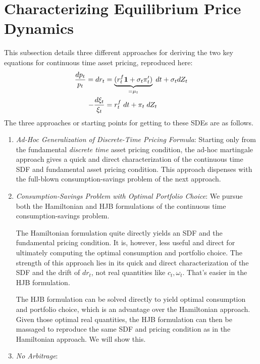 \documentclass[12pt]{article}
\theoremstyle{plain}
\theoremstyle{definition}
\theoremstyle{remark}
\begin{document}
\clearpage
\section{Characterizing Equilibrium Price Dynamics}

This subsection details three different approaches for deriving the two
key equations for continuous time asset pricing, reproduced here:
\begin{align*}
  \frac{dp_t}{p_t}
  =
  dr_t
  &=
  \underbrace{%
    (r_t^f\mathbf{1}+\sigma_t\pi_t')
  }_{=\mu_t}
  \;dt
  +
  \sigma_t
  dZ_t
  \\
  -
  \frac{d\xi_t}{\xi_t}
  &=
  r_t^f\;dt + \pi_t \;dZ_t
\end{align*}
The three approaches or starting points for getting to these SDEs are as
follows.
\begin{enumerate}
  \item
    \emph{Ad-Hoc Generalization of Discrete-Time Pricing Formula}:
    Starting only from the fundamental \emph{discrete time} asset
    pricing condition, the ad-hoc martingale approach gives a quick and
    direct characterization of the continuous time SDF and fundamental
    asset pricing condition.
    This approach dispenses with the full-blown consumption-savings
    problem of the next approach.

  \item
    \emph{Consumption-Savings Problem with Optimal Portfolio Choice}:
    We pursue both the Hamiltonian and HJB formulations of the
    continuous time consumption-savings problem.

    The Hamiltonian formulation quite directly yields an SDF and the
    fundamental pricing condition.
    It is, however, less useful and direct for ultimately computing the
    optimal consumption and portfolio choice. The strength of this
    approach lies in its quick and direct characterization of
    the SDF and the drift of $dr_t$, not real quantities like
    $c_t,\omega_t$.
    That's easier in the HJB formulation.

    The HJB formulation can be solved directly to yield optimal
    consumption and portfolio choice, which is an advantage over the
    Hamiltonian approach.
    Given those optimal real quantities, the HJB formulation can then be
    massaged to reproduce the same SDF and pricing condition as in the
    Hamiltonian approach.
    We will show this.

  \item \emph{No Arbitrage}:
\end{enumerate}
\end{document}
